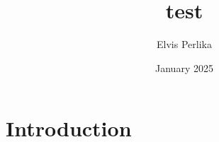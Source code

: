 \documentclass{article}
\title{test}
\author{Elvis Perlika}
\date{January 2025}
\begin{document}
\maketitle

\tableofcontents

\newpage

\section{Introduction}
\end{document}
